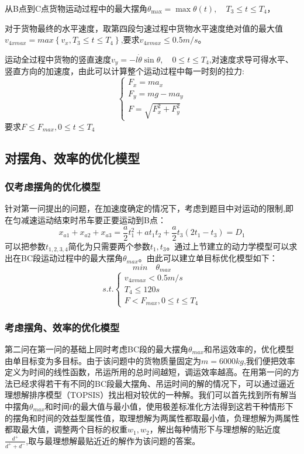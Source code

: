 \documentclass[withoutpreface,bwprint]{cumcmthesis} %
\begin{document}
从B点到C点货物运动过程中的最大摆角$\theta_{\max }=\max \theta(t), \quad T_3 \leqslant t \leqslant T_{4}$，

对于货物最终的水平速度，取第四段匀速过程中货物水平速度绝对值的最大值$v_{4xmax}=max\left \{v_{x},T_3 \leq t \leq T_4\right \}$,要求$v_{4xmax} \leq 0.5m/s$。

运动全过程中货物的竖直速度$v_{y}=-l\dot{\theta}\sin\theta,\quad 0\leq t\leq T_4$,对速度求导可得水平、竖直方向的加速度，由此可以计算整个运动过程中每一时刻的拉力:$$\left\{\begin{array}{l}
        F_{x}=m a_{x}   \\
        F_{y}=mg-ma_{y} \\
        F=\sqrt{F_{x}^2 + F_{y}^2}
    \end{array}\right.$$
要求$F \leq F_{max},0 \leq t \leq T_4$

\subsection{对摆角、效率的优化模型}
\subsubsection{仅考虑摆角的优化模型}
针对第一问提出的问题，在加速度确定的情况下，考虑到题目中对运动的限制,即在匀减速运动结束时吊车要正要运动到B点：$$x_{a1}+x_{a2}+x_{a3}=\frac{a}{2}t_1^2+at_1t_2+\frac{a}{2}t_3(2t_1-t_3)=D_1$$可以把参数$t_{1,2,3,4}$简化为只需要两个参数$t_1,t_3$。通过上节建立的动力学模型可以求出在BC段运动过程中的最大摆角$\theta_{max}$。由此可以建立单目标优化模型如下：
$$min\quad \theta_{max}$$
$$\text{$s.t.$}\left \{\begin{array}{l}
        v_{4xmax}<0.5m/s \\
        T_4\leq120s      \\
        F<F_{max},0\leq t\leq T_4
    \end{array}\right.$$

\subsubsection{考虑摆角、效率的优化模型}

第二问在第一问的基础上同时考虑BC段的最大摆角$\theta_{max}$和吊运效率的，优化模型由单目标变为多目标。由于该问题中的货物质量固定为$m=6000kg$,我们便把效率定义为时间的线性函数，吊运所用的总时间越短，调运效率越高。在用第一问的方法已经求得若干有不同的BC段最大摆角、吊运时间的解的情况下，可以通过逼近理想解排序模型（TOPSIS）找出相对较优的一种解。我们可以首先找到所有解当中摆角$\theta_{max}$和时间$t$的最大值与最小值，使用极差标准化方法得到这若干种情形下的摆角和时间的效益型属性值，取理想解为两属性都取最小值，负理想解为两属性都取最大值，调整两个目标的权重$w_1,w_2$，解出每种情形下与理想解的贴近度$\frac{d^+}{d^++d^-}$,取与最理想解最贴近近的解作为该问题的答案。
\end{document}
